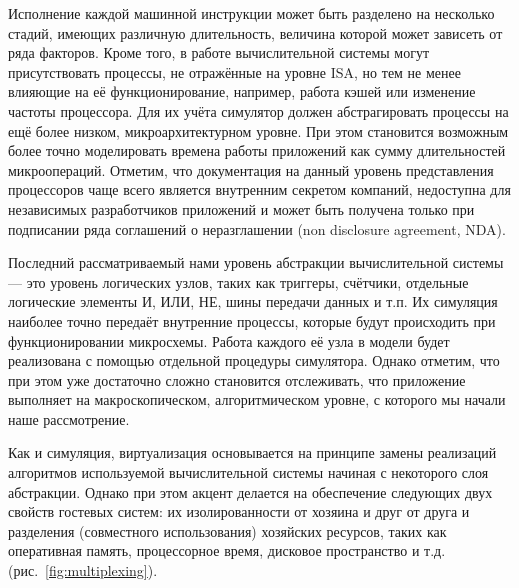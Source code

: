 Исполнение каждой машинной инструкции может быть разделено на несколько стадий, имеющих различную длительность, величина которой может зависеть от ряда факторов. Кроме того, в работе вычислительной системы могут присутствовать процессы, не отражённые на уровне ISA, но тем не менее влияющие на её функционирование, например, работа кэшей или изменение частоты процессора. Для их учёта симулятор должен абстрагировать процессы на ещё более низком, микроархитектурном уровне. При этом становится возможным более точно моделировать времена работы приложений как сумму длительностей микроопераций. Отметим, что документация на данный уровень представления процессоров чаще всего является внутренним секретом компаний, недоступна для независимых разработчиков приложений и может быть получена только при подписании ряда соглашений о неразглашении (\abbr non disclosure agreement, NDA).

Последний рассматриваемый нами уровень абстракции вычислительной системы --- это уровень логических узлов, таких как триггеры, счётчики, отдельные логические элементы И, ИЛИ, НЕ, шины передачи данных и т.п. Их симуляция наиболее точно передаёт внутренние процессы, которые будут происходить при функционировании микросхемы. Работа каждого её узла в модели будет реализована с помощью отдельной процедуры симулятора. Однако отметим, что при этом уже достаточно сложно становится отслеживать, что приложение выполняет на макроскопическом, алгоритмическом уровне, с которого мы начали наше рассмотрение.

Как и симуляция, виртуализация основывается на принципе замены реализаций алгоритмов используемой вычислительной системы начиная с некоторого слоя абстракции. Однако при этом акцент делается на обеспечение следующих двух свойств гостевых систем: их изолированности от хозяина и друг от друга и разделения (совместного использования) хозяйских ресурсов, таких как оперативная память, процессорное время, дисковое пространство и т.д. (рис.~\ref{fig:multiplexing}).

